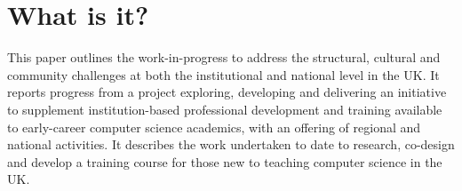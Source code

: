 \documentclass[sigconf]{acmart}
\begin{document}




\maketitle

\section{What is it?}	
This paper outlines the work-in-progress to address the structural,
cultural and community challenges at both the institutional and
national level in the UK. It reports progress from a project
exploring, developing and delivering an initiative to supplement
institution-based professional development and training available to
early-career computer science academics, with an offering of regional
and national activities. It describes the work undertaken to date to
research, co-design and develop a training course for those new to
teaching computer science in the UK.
\end{document}
